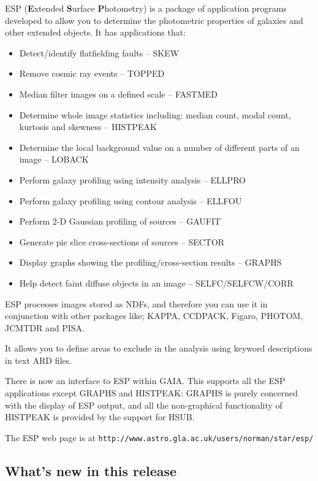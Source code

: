 \documentclass[twoside,11pt]{article}
\newcommand{\htmladdnormallink}[2]{#1}
\newcommand{\xref}[3]{#1}
\newcommand{\xlabel}[1]{}
\begin{document}
ESP ({\bf E}xtended {\bf S}urface {\bf P}hotometry) is a package
of application programs developed to allow you to determine the photometric
properties of galaxies and other extended objects. It has applications that:
\begin{itemize}
\item Detect/identify flatfielding faults -- SKEW
\item Remove cosmic ray events -- TOPPED
\item Median filter images on a defined scale -- FASTMED
\item Determine whole image statistics including: median count, modal count,
kurtosis and skewness -- HISTPEAK
\item Determine the local background value on a number of different parts
of an image -- LOBACK
\item Perform galaxy profiling using intensity analysis -- ELLPRO
\item Perform galaxy profiling using contour analysis -- ELLFOU
\item Perform 2-D Gaussian profiling of sources -- GAUFIT
\item Generate pie slice cross-sections of sources -- SECTOR
\item Display graphs showing the profiling/cross-section results -- GRAPHS
\item Help detect faint diffuse objects in an image -- SELFC/SELFCW/CORR
\end{itemize}

ESP processes images stored as NDFs, and therefore you can use it in
conjunction with other packages like;
\xref{KAPPA}{sun95}{},
\xref{CCDPACK}{sun139}{},
\xref{Figaro}{sun86}{},
\xref{PHOTOM}{sun45}{},
\xref{JCMTDR}{sun132}{}
 and
\xref{PISA}{sun109}{}.

It allows you to define areas to exclude in the analysis
using keyword descriptions in text ARD files.

There is now an interface to ESP within
\xref{GAIA}{sun214}{}.  This supports all the ESP applications except
GRAPHS and HISTPEAK: GRAPHS is purely concerned with the display of
ESP output, and all the non-graphical functionality of HISTPEAK is
provided by the support for HSUB.

The ESP web page is at
\htmladdnormallink{\texttt{http://www.astro.gla.ac.uk/users/norman/star/esp/}}{http://www.astro.gla.ac.uk/users/norman/star/esp/}

\subsection{What's new in this release}
\xlabel{WHATSNEW}
\end{document}
